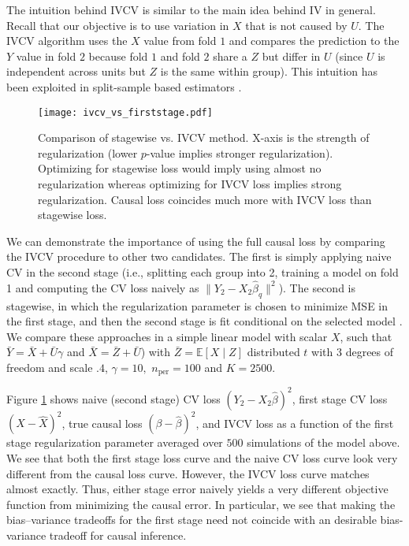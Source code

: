 \documentclass{article}
\newcommand\E{\mathbb{E}}
\newcommand\nper{{n_{\text{per}}}}
\begin{document}
The intuition behind IVCV is similar to the main idea behind IV in general. Recall that our objective is to use variation in $X$ that is not caused by $U$. The IVCV algorithm uses the $X$ value from fold $1$ and compares the prediction to the $Y$ value in fold $2$ because fold $1$ and fold $2$ share a $Z$ but differ in $U$ (since $U$ is independent across units but $Z$ is the same within group). This intuition has been exploited in split-sample based estimators \citep{angrist1995split, imbens1999jackknife,hansen2014instrumental}.

\begin{figure}[t]
	\begin{center}
		\texttt{[image: ivcv\_vs\_firststage.pdf]}
	\end{center}
	\caption{Comparison of stagewise vs. IVCV method. X-axis is the strength of regularization (lower $p$-value implies stronger regularization). Optimizing for stagewise loss would imply using almost no regularization whereas optimizing for IVCV loss implies strong regularization. Causal loss coincides much more with IVCV loss than stagewise loss.}
	\label{fig:ivcv_vs_stagewise}
\end{figure}

We can demonstrate the importance of using the full causal loss by comparing the IVCV procedure to other two candidates. The first is simply applying naive CV in the second stage (i.e., splitting each group into 2, training a model on fold 1 and computing the CV loss naively as $\| Y_2 - X_2 \hat{\beta}_q \|^2$). The second is stagewise, in which the regularization parameter is chosen to minimize MSE in the first stage, and then the second stage is fit conditional on the selected model \citep[as in][]{belloni2012sparse,hartford2016deepiv}. We compare these approaches in a simple linear model with scalar $X$, such that $\bar{Y} = \bar{X} + \bar{U} \gamma$ and  $\bar{X} = \bar{Z} + \bar{U}$) with $\bar{Z} = \E[X \mid Z]$ distributed $t$ with 3 degrees of freedom and scale $.4$, $\gamma=10,$ $\nper = 100$ and $K=2500$. 

Figure \ref{fig:ivcv_vs_stagewise} shows naive (second stage) CV loss $(Y_2 - X_2 \hat{\beta})^2$, first stage CV loss $(X - \hat{X})^2$, true causal loss $(\beta - \hat{\beta})^2$, and IVCV loss as a function of the first stage regularization parameter averaged over $500$ simulations of the model above. We see that both the first stage loss curve and the naive CV loss curve look very different from the causal loss curve. However, the IVCV loss curve matches almost exactly. Thus, either stage error naively yields a very different objective function from minimizing the causal error. In particular, we see that making the bias--variance tradeoffs for the first stage need not coincide with an desirable bias-variance tradeoff for causal inference.
\end{document}
